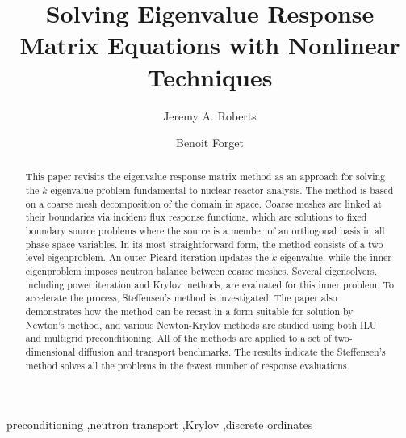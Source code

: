 \documentclass[final, 5p, 10pt]{elsarticle}
\begin{document}
\begin{frontmatter}


\title{Solving Eigenvalue Response Matrix Equations with 
       Nonlinear Techniques}


\author[label1]{Jeremy A. Roberts}
\author[label2]{Benoit Forget}
\address[label1]{Department of Mechanical and Nuclear Engineering,
                 Kansas State University, 3002 Rathbone Hall, Manhattan, KS 66506, USA}
\address[label2]{Department of Nuclear Science and Engineering, 
                 Massachusetts Institute of Technology,
                 77 Massachusetts Avenue, 24-107, Cambridge, MA 02139, USA}

\begin{abstract}
This paper revisits the eigenvalue response matrix method as an 
approach for solving the $k$-eigenvalue problem fundamental to 
nuclear reactor analysis. The method is based on a
coarse mesh decomposition of the domain in space.  Coarse 
meshes are linked at their boundaries via incident flux 
response functions, which are solutions to fixed boundary 
source problems where the source is a member of an orthogonal
basis in all phase space variables.
In its most straightforward form, the method consists of a two-level 
eigenproblem.  An outer Picard iteration updates the $k$-eigenvalue, 
while the inner eigenproblem  imposes neutron balance between coarse 
meshes.  Several eigensolvers, including power iteration and Krylov 
methods, are evaluated for this inner problem.  To accelerate the 
process, Steffensen's method is investigated.
The paper also demonstrates how the method can be recast in a form suitable
for solution by Newton's method, and various Newton-Krylov
methods are studied using both ILU and multigrid preconditioning.
All of the methods are applied to a set of two-dimensional diffusion
and transport benchmarks.  The results indicate the Steffensen's method
solves all the problems in the fewest number of response evaluations.
\end{abstract}

\begin{keyword}

preconditioning \sep neutron transport \sep Krylov \sep discrete ordinates
\end{keyword}

\end{frontmatter}






%
\end{document}
